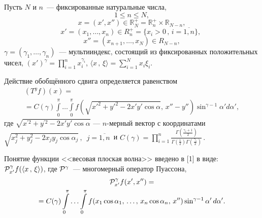 



Пусть $N$ и $n$~--- фиксированные натуральные числа,
$$1\leqslant n\leqslant N,$$
$$x=(x',x'')\in \mathbb{R}_N^+=\mathbb{R}_n^+\times\mathbb{R}_{N-n},$$
$$
x'=(x_1,\ldots,x_n)\in R_n^+=\{x_i>0\,,\, i=\overline{1,n}\},\,\,
$$
$$
x''=(x_{n+1},\ldots,x_N)\in R_{N-n},
$$
$\gamma=(\gamma_1,\ldots,\gamma_n)$~--- мультииндекс, состоящий из
фиксированных положительных чисел, $(x')^\gamma=\prod_{i=1}^n x_i^{\gamma_i}$,
$\langle x\,,\,\xi\rangle{=}\sum_{i=1}^{N}x_i\xi_i$.

Действие обобщённого сдвига определяется  равенством
\begin{multline*}
(T^y f)(x)=
\\=
C(\gamma)\int\limits_{0}^{\pi}
\ldots \int\limits_{0}^{\pi}
f\left(\sqrt{x'^2{+}y'^2{-}2x'y'\cos\alpha},\,
 x''{-}y''\right)\sin^{\gamma-1}\alpha' d\alpha',
\end{multline*}
где $\sqrt{x^{'2}+y^{'2}-2x'y'\cos\alpha}$ --- $n$-мерный вектор  с координатами\\
$\sqrt{x_j^{2}+y_j^{2}-2x_jy_j\cos\alpha_j}\,,\,\,\, j=\overline{1,n}$\, и
$
C(\gamma)=\prod\limits_{i=1}^n\frac{\Gamma\left(\frac{\gamma_i+1}{2}\right)}
{\Gamma\left(\frac{1}{2}\right)\Gamma\left(\frac{\gamma_i}{2}\right)}\,.
$

Понятие функции <<весовая плоская волна>> введено в [1] в виде:
${\cal P}^\gamma_{x'} f(\langle x\,,\,\xi\rangle)$,
где ${\cal P}^\gamma$~--- многомерный оператор Пуассона,
\begin{multline*}
{\cal P}^\gamma_{x'} f(x',x'')=
\\=
C(\gamma)
\int\limits_0^\pi\ldots\int\limits_0^\pi f(x_1\cos\alpha_1,\,\ldots,\,x_n\cos\alpha_n,\,x'')
\sin^{\gamma-1}\alpha'\,d\alpha'.
\end{multline*}

